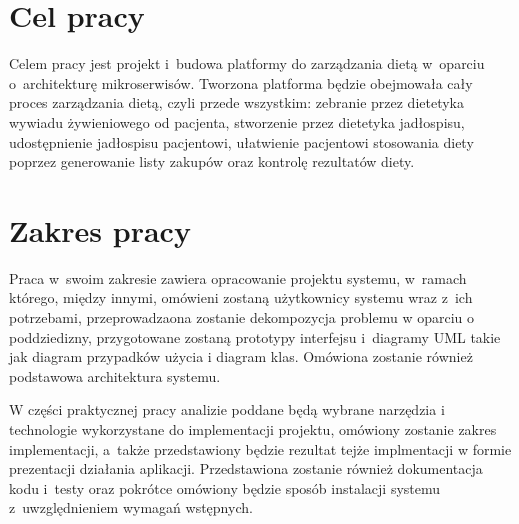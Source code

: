 \section*{Cel pracy}\label{sec:thesis-goal}

Celem pracy jest projekt i~budowa platformy do zarządzania dietą w~oparciu o~architekturę mikroserwisów.
Tworzona platforma będzie obejmowała cały proces zarządzania dietą, czyli przede wszystkim:
zebranie przez dietetyka wywiadu żywieniowego od pacjenta,
stworzenie przez dietetyka jadłospisu,
udostępnienie jadłospisu pacjentowi,
ułatwienie pacjentowi stosowania diety poprzez generowanie listy zakupów
oraz kontrolę rezultatów diety.

\section*{Zakres pracy}\label{sec:scope-of-work}

Praca w~swoim zakresie zawiera opracowanie projektu systemu, w~ramach którego, między innymi,
omówieni zostaną użytkownicy systemu wraz z~ich potrzebami,
przeprowadzaona zostanie dekompozycja problemu w oparciu o poddziedizny,
przygotowane zostaną prototypy interfejsu i~diagramy UML takie jak diagram przypadków użycia i diagram klas.
Omówiona zostanie również podstawowa architektura systemu.
\par
W części praktycznej pracy analizie poddane będą wybrane narzędzia i technologie wykorzystane do implementacji projektu,
omówiony zostanie zakres implementacji, a~także przedstawiony będzie rezultat tejże implmentacji w formie prezentacji działania aplikacji.
Przedstawiona zostanie również dokumentacja kodu i~testy oraz pokrótce omówiony będzie sposób instalacji systemu z~uwzględnieniem wymagań wstępnych.

\thispagestyle{normal}
